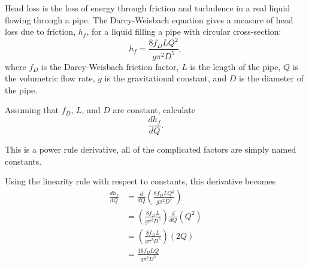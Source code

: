\documentclass{ximera}
\author{Emma Smith Zbarsky}
\begin{document}
\begin{exercise}

Head loss is the loss of energy through friction and turbulence in a
real liquid flowing through a pipe. The Darcy-Weisbach equation gives a
measure of head loss due to friction, $h_f$, for a liquid filling a pipe
with circular cross-section: \[h_f = \frac{8f_DLQ^2}{g\pi^2D^5}, \]
where $f_D$ is the Darcy-Weisbach friction factor, $L$ is the length of
the pipe, $Q$ is the volumetric flow rate, $g$ is the gravitational
constant, and $D$ is the diameter of the pipe.

Assuming that $f_D$, $L$, and $D$ are constant, calculate
\[\frac{dh_f}{dQ}.\]


\begin{hint}
This is a power rule derivative, all of the complicated factors are
simply named constants.
\end{hint}


\begin{hint}
Using the linearity rule with respect to constants, this derivative
becomes
\begin{align*} \frac{dh_f}{dQ} &= \frac{d}{dQ}\left(\frac{8f_DLQ^2}{g\pi^2D^5}\right) \\
&= \left(\frac{8f_DL}{g\pi^2D^5}\right) \frac{d}{dQ}\left(Q^2\right) \\
&= \left(\frac{8f_DL}{g\pi^2D^5}\right)(2Q) \\
&= \boxed{\frac{16f_DLQ}{g\pi^2D^5}}
\end{align*}
\end{hint}


\begin{multipleChoice}
\end{multipleChoice}

\end{exercise}
\end{document}

